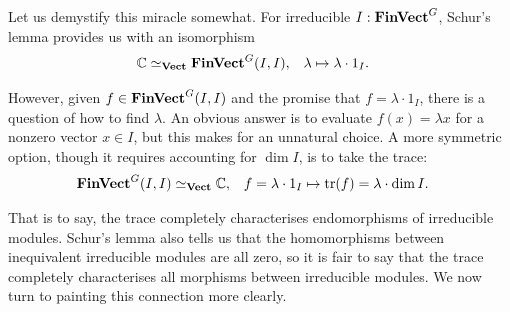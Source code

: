 \par Let us demystify this miracle somewhat. For irreducible $I : \operatorname{\mathbf{FinVect}}^G$, Schur's lemma provides us with an isomorphism
\begin{align*}
  \mathbb{C} &\simeq_{\operatorname{\mathbf{Vect}}} \operatorname{\mathbf{FinVect}}^G (I, I)
  ,
  & \lambda &\mapsto \lambda \cdot 1_I
  .
\end{align*}
\par However, given $f \in \operatorname{\mathbf{FinVect}}^G (I, I)$ and the promise that $f = \lambda \cdot 1_I$, there is a question of how to find $\lambda$. An obvious answer is to evaluate $f(x) = \lambda x$ for a nonzero vector $x \in I$, but this makes for an unnatural choice. A more symmetric option, though it requires accounting for $\dim I$, is to take the trace:
\begin{align*}
  \operatorname{\mathbf{FinVect}}^G (I, I)
  &\simeq_{\operatorname{\mathbf{Vect}}} \mathbb{C}
  ,
  & f = \lambda \cdot 1_I &\mapsto \operatorname{tr}(f) = \lambda \cdot \dim I
  .
\end{align*}
\par That is to say, the trace completely characterises endomorphisms of irreducible modules. Schur's lemma also tells us that the homomorphisms between inequivalent irreducible modules are all zero, so it is fair to say that the trace completely characterises all morphisms between irreducible modules. We now turn to painting this connection more clearly.

\skoop
